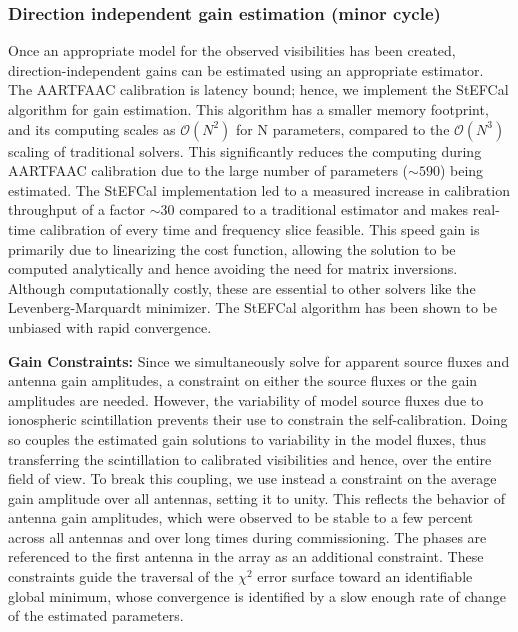 \documentclass{aa}
\begin{document}
\subsubsection{\label{sub:Direction-independent-gain}Direction independent gain
estimation (minor cycle)}

Once  an appropriate  model  for  the observed  visibilities  has been  created,
direction-independent gains can be estimated using an appropriate estimator. The
AARTFAAC  calibration  is  latency   bound;  hence,  we  implement  the  StEFCal
\citep{salvini2014stef,salvini2014stefursi} algorithm for gain estimation.  This
algorithm  has  a  smaller  memory   footprint,  and  its  computing  scales  as
$\mathcal{O}(N^{2})$  for  N parameters,  compared  to the  $\mathcal{O}(N^{3})$
scaling of traditional solvers.  This significantly reduces the computing during
AARTFAAC calibration due  to the large number of  parameters ($\sim$$590$) being
estimated.  The StEFCal implementation led to a measured increase in calibration
throughput  of   a  factor   $\sim$$30$  \citep{salvini2014stef}  compared   to  a
traditional  estimator  and  makes  real-time  calibration  of  every  time  and
frequency slice feasible.   This speed gain is primarily  due to linearizing the
cost  function, allowing  the solution  to  be computed  analytically and  hence
avoiding the need for  matrix inversions. Although computationally costly, these
are  essential to  other solvers  like the  Levenberg-Marquardt  minimizer.  The
StEFCal algorithm has been shown to be unbiased with rapid convergence.

\textbf{Gain  Constraints:} Since  we simultaneously  solve for  apparent source
fluxes and antenna  gain amplitudes, a  constraint on either  the source
fluxes  or the gain  amplitudes are  needed. However,  the variability  of model
source fluxes due  to ionospheric scintillation prevents their  use to constrain
the  self-calibration.   Doing  so  couples  the  estimated  gain  solutions  to
variability  in  the  model  fluxes,  thus  transferring  the  scintillation  to
calibrated visibilities and hence, over the entire field of view.  To break this
coupling, we  use instead a  constraint on the  average gain amplitude  over all
antennas,  setting it to  unity.  This  reflects the  behavior of  antenna gain
amplitudes,  which were  observed  to be  stable  to a  few  percent across  all
antennas and over long times during commissioning.  The phases are referenced to
the first antenna  in the array as an  additional constraint.  These constraints
guide  the traversal  of the  $\chi^{2}$ error  surface toward  an identifiable
global minimum, whose convergence is identified  by a slow enough rate of change
of the estimated parameters.
\end{document}
